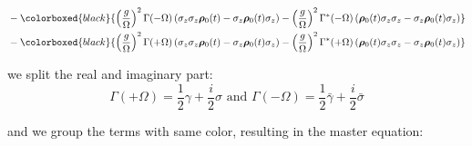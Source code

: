 \documentclass[%
preprint,
onecolumn,
notitlepag,
 amsmath,amssymb,
 aps,
 pra,
]{revtex4-2}
\begin{document}
\begin{equation}
\begin{aligned}
&- \colorboxed{black}{ \left(\frac{g}{\Omega} \right)^2  \Gamma(-\Omega)\left(\sigma_z  \sigma_z  \boldsymbol{\rho}_{\mathrm{0}}(t)-\sigma_z \boldsymbol{\rho}_{\mathrm{0}}(t) \sigma_z \right)  - \left(\frac{g}{\Omega} \right)^2  \Gamma^{*}(-\Omega)\left(\boldsymbol{\rho}_{\mathrm{0}}(t)  \sigma_z \sigma_z -\sigma_z \boldsymbol{\rho}_{\mathrm{0}}(t) \sigma_z \right)} \\
&- \colorboxed{black}{ \left(\frac{g}{\Omega} \right)^2  \Gamma(+\Omega)\left(\sigma_z  \sigma_z  \boldsymbol{\rho}_{\mathrm{0}}(t)-\sigma_z \boldsymbol{\rho}_{\mathrm{0}}(t) \sigma_z \right)  - \left(\frac{g}{\Omega} \right)^2  \Gamma^{*}(+\Omega)\left(\boldsymbol{\rho}_{\mathrm{0}}(t)  \sigma_z \sigma_z -\sigma_z \boldsymbol{\rho}_{\mathrm{0}}(t) \sigma_z \right)} 
\end{aligned}\end{equation}

we split the real and imaginary part:
\begin{equation}
\Gamma(+\Omega)=\frac{1}{2} \gamma+\frac{i}{2} \sigma \text { and } \Gamma(-\Omega)=\frac{1}{2} \bar{\gamma}+\frac{i}{2} \bar{\sigma}\end{equation}

and we  group the terms with same color, resulting in the master equation: 
\end{document}
